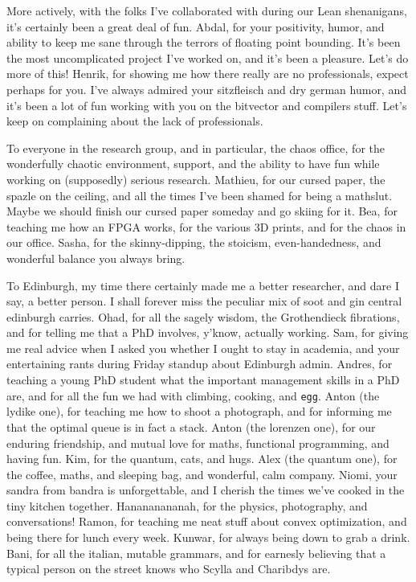 More actively, with the folks I've collaborated with during our Lean shenanigans, it's certainly been a great deal of fun.
Abdal, for your positivity, humor, and ability to keep me sane through the terrors of floating point bounding.
It's been the most uncomplicated project I've worked on,
and it's been a pleasure. Let's do more of this!
Henrik, for showing me how there really are no professionals,
expect perhaps for you. I've always admired your sitzfleisch and dry german humor,
and it's been a lot of fun working with you on the bitvector and compilers stuff.
Let's keep on complaining about the lack of professionals.

To everyone in the research group, and in particular, the chaos office,
for the wonderfully chaotic environment, support, and the ability to have fun while working on (supposedly) serious research.
Mathieu, for our cursed paper, the spazle on the ceiling, and all the times I've been shamed for being a mathslut.
Maybe we should finish our cursed paper someday and go skiing for it.
Bea, for teaching me how an FPGA works, for the various 3D prints, and for the chaos in our office.
Sasha, for the skinny-dipping, the stoicism, even-handedness, and wonderful balance you always bring.


To Edinburgh, my time there certainly made me a better researcher, and dare I say, a better person.
I shall forever miss the peculiar mix of soot and gin central edinburgh carries.
Ohad, for all the sagely wisdom, the Grothendieck fibrations, and for telling me that a PhD involves, y'know, actually working.
Sam, for giving me real advice when I asked you whether I ought to stay in academia, and your entertaining rants during Friday standup about Edinburgh admin.
Andres, for teaching a young PhD student what the important management skills in a PhD are,
and for all the fun we had with climbing, cooking, and \texttt{egg}.
Anton (the lydike one), for teaching me how to shoot a photograph, and for informing me that the optimal queue is in fact a stack.
Anton (the lorenzen one), for our enduring friendship, and mutual love for maths, functional programming, and having fun.
Kim, for the quantum, cats, and hugs.
Alex (the quantum one), for the coffee, maths, and sleeping bag, and wonderful, calm company.
Niomi, your sandra from bandra is unforgettable, and I cherish the times we've cooked in the tiny kitchen together.
Hanananananah, for the physics, photography, and conversations!
Ramon, for teaching me neat stuff about convex optimization, and being there for lunch every week.
Kunwar, for always being down to grab a drink.
Bani, for all the italian, mutable grammars, and for earnesly believing that a typical person on the street knows who Scylla and Charibdys are.


